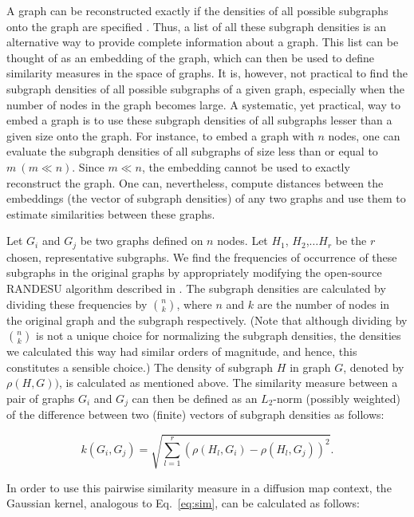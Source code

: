% 
A graph can be reconstructed exactly if the densities of all possible
subgraphs onto the graph are specified \cite{Lov06limits}.
% 
Thus, a list of all these subgraph densities is an alternative way to
provide complete information about a graph.
% 
This list can be thought of as an embedding of the graph, which can
then be used to define similarity measures in the space of graphs.
% 
It is, however, not practical to find the subgraph densities of all
possible subgraphs of a given graph, especially when the number of
nodes in the graph becomes large.
% 
A systematic, yet practical, way to embed a graph is to use these
subgraph densities of all subgraphs lesser than a given size onto the
graph.
% 
For instance, to embed a graph with $n$ nodes, one can evaluate the
subgraph densities of all subgraphs of size less than or equal to
$m~(m \ll n)$.
% 
Since $m \ll n$, the embedding cannot be used to exactly reconstruct
the graph.
% 
One can, nevertheless, compute distances between the embeddings (the
vector of subgraph densities) of any two graphs and use them to
estimate similarities between these graphs.
% 

Let $G_i$ and $G_j$ be two graphs defined on $n$ nodes.
% 
Let $H_1$, $H_2$,$\ldots H_r$ be the $r$ chosen, representative
subgraphs.
% 
We find the frequencies of occurrence of these subgraphs in the
original graphs by appropriately modifying the open-source RANDESU
algorithm described in \cite{Wern06fanmod:}.
% 
The subgraph densities are calculated by dividing these frequencies by
$n\choose{k}$, where $n$ and $k$ are the number of nodes in the
original graph and the subgraph respectively.
% 
(Note that although dividing by $n\choose{k}$ is not a unique choice
for normalizing the subgraph densities, the densities we calculated
this way had similar orders of magnitude, and hence, this constitutes
a sensible choice.)
% 
The density of subgraph $H$ in graph $G$, denoted by $\rho(H,G))$, is
calculated as mentioned above.
% 
The similarity measure between a pair of graphs $G_i$ and $G_j$ can
then be defined as an $L_2$-norm (possibly weighted) of the difference
between two (finite) vectors of subgraph densities as follows:

\begin{equation}
  k(G_i,G_j) = \sqrt{\sum_{l=1}^{r}\left(\rho(H_l,G_i)-\rho(H_l,G_j)\right)^2}.
  \label{eq:k1}
\end{equation}

In order to use this pairwise similarity measure in a diffusion map
context, the Gaussian kernel, analogous to Eq.~\ref{eq:sim}, can be
calculated as follows:

